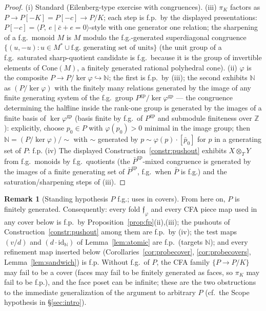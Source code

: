 \documentclass[11pt]{article}
\theoremstyle{definition}
\newtheorem{remark}[theorem]{Remark}
\newcommand{\gp}{\mathrm{gp}}
\newcommand{\Cone}{\mathrm{Cone}}
\begin{document}
\begin{proof}
(i) Standard (Eilenberg-type exercise with congruences).
(iii) $\pi_K$ factors as $P\to P[-K]=P[-c]\to P/K$; each step is
f.p.\ by the displayed presentations: $P[-c]=\langle P,\ e
\mid \bar c+e=0\rangle$-style with one generator one relation;
the sharpening of a f.g.\ monoid $M$ is $M$ modulo the
f.g.-generated superdiagonal congruence $\{(u,-u):u\in
M^*\cup\text{f.g.\ generating set of units}\}$ (the unit group of
a f.g.\ saturated sharp-quotient candidate is f.g.\ because it
is the group of invertible elements of $\Cone(M)$, a finitely
generated rational polyhedral cone).
(ii) $\varphi$ is the composite $P\to P/\ker\varphi
\hookrightarrow\mathbb N$; 
the first is f.p.\ by (iii); the
second exhibits $\mathbb N$ as $(P/\ker\varphi)$ 
with the
finitely many relations generated by the image of any finite
generating system of the f.g.\ group $P^{\gp}/\ker\varphi^{\gp}$
--- the congruence determining the halfline inside the rank-one
group is generated by the images of a finite basis of
$\ker\varphi^{\gp}$ (basis finite by f.g.\ of $P^{\gp}$ and
submodule finiteness over $\mathbb Z$): explicitly, choose
$p_0\in P$ with $\varphi(p_0)>0$ minimal in the image group;
then $\mathbb N=(P/\ker\varphi)/\!\sim$ with $\sim$ generated by
$p\sim\varphi(p)\cdot[\bar p_0]$ for $p$ in a generating set of
$P$: f.p.
(iv) The displayed Construction~\ref{constr:pushout} exhibits
$X\otimes_TY$ from f.g.\ monoids by f.g.\ quotients (the
$\bar P^{\gp}$-mixed congruence is generated by the images of a
finite generating set of $\bar P^{\gp}$, f.g.\ when $\bar P$ is
f.g.) and the saturation/sharpening steps of (iii).
\end{proof}

\begin{remark}[Standing hypothesis $P$ f.g.; uses in covers]
\label{rem:nonfg}
From here on, $P$ is finitely generated. Consequently: every
fold $\mathfrak f_\varphi$ 
and every CFA piece map used in any
cover below is f.p.\ by Proposition~\ref{prop:fp}(ii),(iii); the
pushouts of Construction~\ref{constr:pushout} among them are
f.p.\ by (iv); the test maps $(v/d)$ and
$(d\cdot\mathrm{id}_{\mathbb N})$ of Lemma~\ref{lem:atomic} are
f.p.\ (targets $\mathbb N$); and every refinement map inserted
below (Corollaries~\ref{cor:probecover}, \ref{cor:probecovers},
Lemma~\ref{lem:sandwich}) is f.p. Without f.g.\ of $P$, the CFA
family $\{P\to P/K\}$ may fail to be a cover (faces may fail to
be finitely generated as faces, so $\pi_K$ may fail to be
f.p.), and the face poset can be infinite; these are the two
obstructions to the immediate generalization of the argument to
arbitrary $P$ \textup{(}cf.\ the Scope hypothesis in
\S\ref{sec:intro}\textup{)}.
\end{remark}
\end{document}
